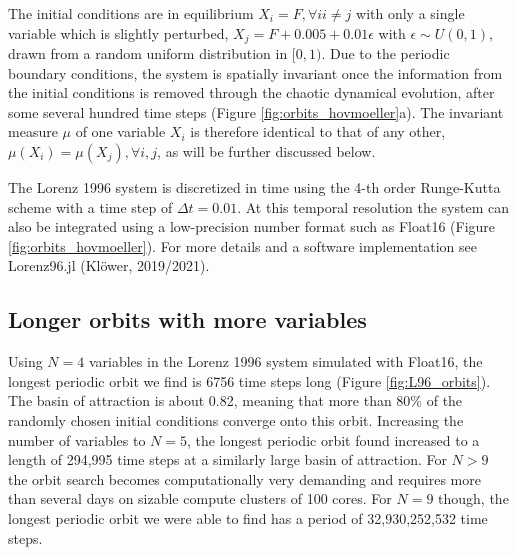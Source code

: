 The initial conditions are in equilibrium $X_i = F, \forall i i \neq j$ with only a single variable which is slightly perturbed, 
$X_j = F + 0.005 + 0.01\epsilon$ with $\epsilon \sim U(0,1)$, drawn from a random uniform distribution in $[0,1)$.
Due to the periodic boundary conditions, the system is spatially invariant once the information from the initial conditions
is removed through the chaotic dynamical evolution, after some several hundred time steps (Figure \ref{fig:orbits_hovmoeller}a).
The invariant measure $\mu$ of one variable $X_i$ is therefore identical to that of any other, $\mu(X_i) = \mu(X_j), \forall i,j$,
as will be further discussed below.

The Lorenz 1996 system is discretized in time using the 4-th order Runge-Kutta scheme \citep{Butcher2008} with a time
step of $\Delta t = 0.01$. At this temporal resolution the system can also be integrated using a low-precision number format
such as Float16 (Figure \ref{fig:orbits_hovmoeller}). For more details and a software implementation see Lorenz96.jl (Klöwer, 2019/2021).

\subsection{Longer orbits with more variables}

Using $N=4$ variables in the Lorenz 1996 system simulated with Float16, the longest periodic orbit we find is 6756 time steps long
(Figure \ref{fig:L96_orbits}). The basin of attraction is about 0.82, meaning that more than 80\% of the randomly chosen initial
conditions converge onto this orbit. Increasing the number of variables to $N=5$, the longest periodic orbit found increased
to a length of 294,995 time steps at a similarly large basin of attraction. For $N>9$ the orbit search becomes computationally
very demanding and requires more than several days on sizable compute clusters of 100 cores. For $N=9$ though, the longest
periodic orbit we were able to find has a period of 32,930,252,532 time steps. 

